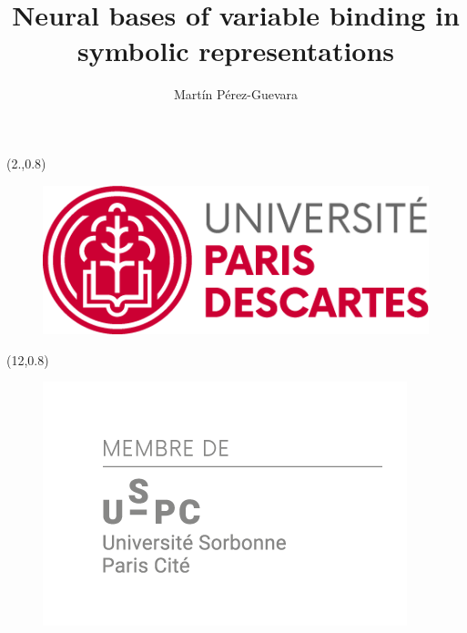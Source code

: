 \documentclass[twoside, justified, notoc, nobib, 
	nohyper]{tufte-book}
\title{Neural bases of variable binding in symbolic representations}
\author{Mart\'in P\'erez-Guevara}
\begin{document}

\begin{titlepage}

\begin{textblock}{5}(2.,0.8)
\begin{figure}
\includegraphics[width=\linewidth]{figures/title/LogoParisDescartes.png}
\end{figure}
\end{textblock}

\begin{textblock}{2.4}(12,0.8)
\begin{figure}
\includegraphics[width=\linewidth]{figures/title/Membre-USPC-Gris_06-09-2016.png}
\end{figure}
\end{textblock}


\begin{fullwidth}
 ~\\[1cm]


\end{fullwidth}
\end{titlepage}
\end{document}
